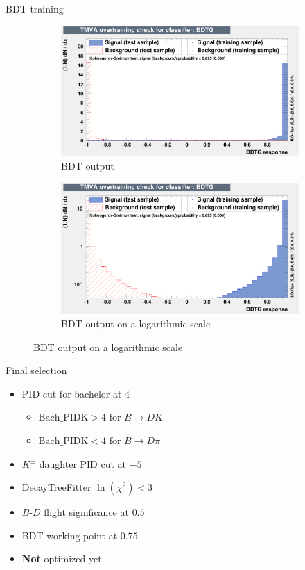 \documentclass{beamer}
\begin{document}
\begin{frame}{BDT training}
    \begin{figure}
    \centering
    \vspace{-0.2cm}
    \begin{subfigure}{0.5\textwidth}
      \includegraphics[width = 1.0\textwidth]{BDToutput.png}
      \caption{BDT output}
    \end{subfigure}%
    \begin{subfigure}{0.5\textwidth}
      \includegraphics[width = 1.0\textwidth]{BDToutputLog.png}
      \caption{BDT output on a logarithmic scale}
    \end{subfigure}
  \end{figure}
\end{frame}

\begin{frame}{Final selection}
  \begin{itemize}
    \setlength\itemsep{1.3em}
    \item{PID cut for bachelor at $4$}
    \begin{itemize}
      \item{$\text{Bach\_PIDK} > 4$ for $B\to DK$}
      \item{$\text{Bach\_PIDK} < 4$ for $B\to D\pi$}
    \end{itemize}
    \item{$K^\pm$ daughter PID cut at $-5$}
    \item{DecayTreeFitter $\ln(\chi^2) < 3$}
    \item{$B$-$D$ flight significance at $0.5$}
    \item{BDT working point at $0.75$}
    \item{\textbf{Not} optimized yet}
  \end{itemize}
\end{frame}
\end{document}

